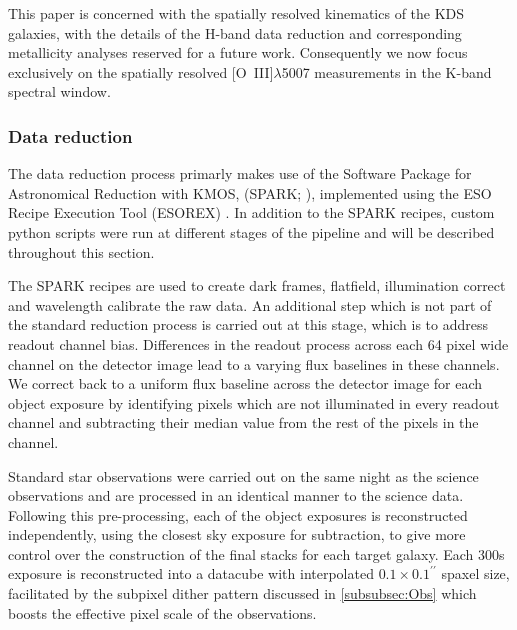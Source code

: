 \documentclass[fleqn,usenatbib]{mn2e}
\begin{document}
This paper is concerned with the spatially resolved kinematics of the KDS galaxies, with the details of the H-band data reduction and corresponding metallicity analyses reserved for a future work.
Consequently we now focus exclusively on the spatially resolved [O~{\sc III}]$\lambda$5007 measurements in the K-band spectral window. 

\subsubsection{Data reduction}\label{subsubsec:datareduction}

The data reduction process primarly makes use of the Software Package for Astronomical Reduction with KMOS, (SPARK; \cite{Davies2013}), implemented using the ESO Recipe Execution Tool (ESOREX) \citep{Freudling2013}.
In addition to the SPARK recipes, custom python scripts were run at different stages of the pipeline and will be described throughout this section.

The SPARK recipes are used to create dark frames, flatfield, illumination correct and wavelength calibrate the raw data.
An additional step which is not part of the standard reduction process is carried out at this stage, which is to address readout channel bias.
Differences in the readout process across each 64 pixel wide channel on the detector image lead to a varying flux baselines in these channels.
We correct back to a uniform flux baseline across the detector image for each object exposure by identifying pixels which are not illuminated in every readout channel and subtracting their median value from the rest of the pixels in the channel.

Standard star observations were carried out on the same night as the science observations and are processed in an identical manner to the science data.
Following this pre-processing, each of the object exposures is reconstructed independently, using the closest sky exposure for subtraction, to give more control over the construction of the final stacks for each target galaxy.
Each 300s exposure is reconstructed into a datacube with interpolated $0.1\times0.1^{\prime\prime}$ spaxel size, facilitated by the subpixel dither pattern discussed in \cref{subsubsec:Obs} which boosts the effective pixel scale of the observations. \\
\end{document}
